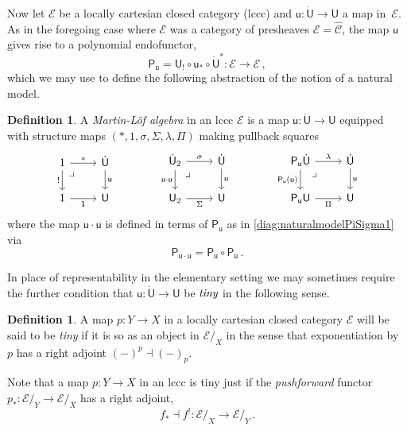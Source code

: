 \documentclass[12pt,reqno]{amsart}
\newcommand{\CC}{\ensuremath{\mathcal{C}}}
\newcommand{\EE}{\ensuremath{\mathcal{E}}}
\newcommand{\alg}[1]{\ensuremath{\mathsf{#1}}}
\renewcommand{\to}{\ensuremath{\rightarrow}}
\newcommand{\too}{\ensuremath{\longrightarrow}}
\renewcommand{\t}{\ensuremath{\mathsf{u}}}
\newcommand{\T}{\ensuremath{\mathsf{U}}}
\newcommand{\TT}{\ensuremath{\dot{\mathsf{U}}}}
\newcommand{\tT}{\ensuremath{{\t}:\TT\to\T}}
\newcommand{\pbcorner}{\arrow[dr,phantom,"\lrcorner" very near start, shift right=.5ex]} %
\theoremstyle{remark}
\theoremstyle{definition}
\newtheorem{definition}[theorem]{Definition}
\begin{document}
Now let $\EE$ be a locally cartesian closed category (lccc) and $\tT$ a map in~$\EE$.  As in the foregoing case where $\EE$ was a category of presheaves $\EE=\widehat{\CC}$, the map $\t$ gives rise to a polynomial endofunctor,
$$\alg{P}_\t = \T_! \circ \t_* \circ \TT^* : \EE\too\EE\,,$$
which we may use to define the following abstraction of the notion of a natural model.
\begin{definition}\label{def:MLalg}
A \emph{Martin-L\"of algebra} in an lccc $\EE$ is a map $\tT$ equipped with structure maps $(*, 1, \sigma, \Sigma, \lambda, \Pi)$ making pullback squares 
\begin{equation}\label{diag:MLalgDef}
\begin{tikzcd}
	1 \ar[r,"*"] \ar[d,swap,"!"] \pbcorner &  \TT \ar[d, "\t"]\\  
	1 \ar[r, swap,"\mathsf{1}"] & \T
 \end{tikzcd}\qquad \qquad 
 \begin{tikzcd}
	\TT_2  \ar[r,"\sigma"] \ar[d,swap,"\t\cdot\t"] \pbcorner &  \TT \ar[d, "\t"]\\  
	\T_2 \ar[r,swap, "\Sigma"] & \T
\end{tikzcd} \qquad \qquad 
	 \begin{tikzcd}
	\alg{P}_\t\TT \ar[r,"\lambda"] \ar[d,swap,"\alg{P}_\t(\t)"] \pbcorner &  \TT \ar[d, "\t"]\\  
	\alg{P}_\t\T \ar[r,swap, "\Pi"] & \T
 \end{tikzcd} 
 \end{equation}
 where the map $\t\cdot\t$ is defined in terms of $\alg{P}_\t$ as in \eqref{diag:naturalmodelPiSigma1} via
 \[
\alg{P}_{\t\cdot\t} = \alg{P}_{\t}\circ \alg{P}_{\t}\,.
 \]
   \end{definition}

In place of representability in the elementary setting we may sometimes require the further condition that $\tT$ be $\emph{tiny}$ in the following sense.

\begin{definition}\label{def:tinymap}
 A map $p : Y \to X$ in a locally cartesian closed category $\EE$ will be said to be \emph{tiny} if it is so as an object in $\EE/_{\!X}$ in the sense that exponentiation by $p$ has a right adjoint $(-)^p \dashv (-)_p$. 
\end{definition}

Note that a map $p : Y \to X$ in an lccc is tiny just if the \emph{pushforward} functor $p_* : \EE/_Y \to \EE/_X$ has a right adjoint,
\[
f_* \dashv f^! : \EE/_X \too \EE/_Y\,.
\]
\end{document}
